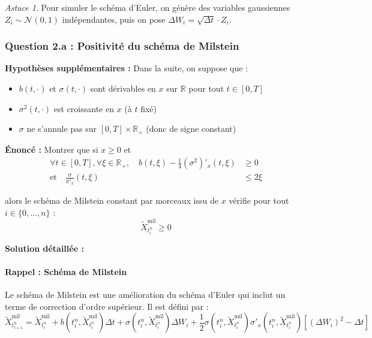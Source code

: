 \documentclass[12pt,a4paper]{article}
\theoremstyle{definition}
\theoremstyle{remark}
\newtheorem*{astuce}{Astuce}
\newcommand{\R}{\mathbb{R}}
\begin{document}
\begin{astuce}
Pour simuler le schéma d'Euler, on génère des variables gaussiennes $Z_i \sim \mathcal{N}(0,1)$ indépendantes, puis on pose $\Delta W_i = \sqrt{\Delta t} \cdot Z_i$.
\end{astuce}

\subsubsection{Question 2.a : Positivité du schéma de Milstein}

\textbf{Hypothèses supplémentaires :} Dans la suite, on suppose que :
\begin{itemize}
\item $b(t,\cdot)$ et $\sigma(t,\cdot)$ sont dérivables en $x$ sur $\R$ pour tout $t \in [0,T]$
\item $\sigma^2(t,\cdot)$ est croissante en $x$ (à $t$ fixé)
\item $\sigma$ ne s'annule pas sur $[0,T] \times \R_+$ (donc de signe constant)
\end{itemize}

\textbf{Énoncé :} Montrer que si $x \geq 0$ et
\begin{align}
\forall t \in [0,T], \forall \xi \in \R_+, \quad b(t,\xi) - \frac{1}{4}(\sigma^2)'_x(t,\xi) &\geq 0 \\
\text{et} \quad \frac{\sigma}{\sigma'_x}(t,\xi) &\leq 2\xi
\end{align}

alors le schéma de Milstein constant par morceaux issu de $x$ vérifie pour tout $i \in \{0,\ldots,n\}$ :
\[
\tilde{X}_{t_i^n}^{\text{mil}} \geq 0
\]

\textbf{Solution détaillée :}

\paragraph{Rappel : Schéma de Milstein}
Le schéma de Milstein est une amélioration du schéma d'Euler qui inclut un terme de correction d'ordre supérieur. Il est défini par :
\begin{equation}
\tilde{X}_{t_{i+1}^n}^{\text{mil}} = \tilde{X}_{t_i^n}^{\text{mil}} + b(t_i^n, \tilde{X}_{t_i^n}^{\text{mil}})\Delta t + \sigma(t_i^n, \tilde{X}_{t_i^n}^{\text{mil}})\Delta W_i + \frac{1}{2}\sigma(t_i^n, \tilde{X}_{t_i^n}^{\text{mil}})\sigma'_x(t_i^n, \tilde{X}_{t_i^n}^{\text{mil}})[(\Delta W_i)^2 - \Delta t]
\end{equation}
\end{document}
